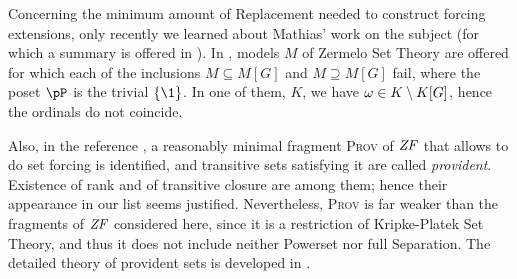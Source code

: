 Concerning the minimum amount of Replacement needed to construct
forcing extensions, only recently we learned about Mathias' work on the
subject (for which a summary is offered in
\cite[Sect.~6]{kanamori-mathias}). In
\cite[Sect.~1]{mathias:hal-01188043}, models $M$ of Zermelo Set Theory
are offered for which each of the inclusions $M\subseteq M[G]$ and
$M\supseteq M[G]$ fail, where the poset $\pP$ is the trivial $\{\1
\}$. In one of them, $K$, we have $\omega\in K \setminus K[G]$, hence the
ordinals do not coincide.

Also, in the reference \cite{mathias-provident}, a reasonably minimal
fragment \textsc{Prov} of $\mathit{ZF}$ that allows to do set forcing is
identified, and transitive sets satisfying it are called
\emph{provident}. Existence of rank and of transitive closure are
among them; hence their appearance in our list seems
justified. Nevertheless, \textsc{Prov} is far weaker than the
fragments of $\mathit{ZF}$ considered here, since it is a restriction of
Kripke-Platek Set Theory, and thus it does not include neither
Powerset nor full Separation. The detailed theory of provident sets is
developed in \cite{mathias-bowler-gentle}. %




